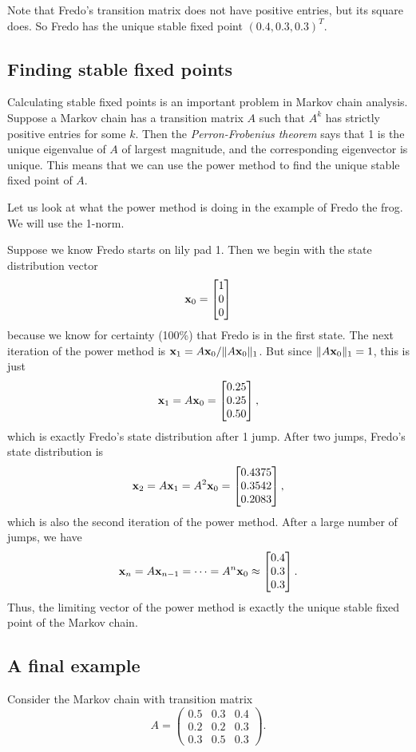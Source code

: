 Note that Fredo's transition matrix does not have positive entries, but its square does. 
So Fredo has the unique stable fixed point $(0.4, 0.3, 0.3)^T$.

\subsection*{Finding stable fixed points}
Calculating stable fixed points is an important problem in Markov chain analysis. 
Suppose a Markov chain has a transition matrix $A$ such that $A^k$ has strictly positive entries for some $k$. 
Then the \emph{Perron-Frobenius theorem} says that 1 is the unique eigenvalue of $A$ of largest magnitude, and the corresponding eigenvector is unique. 
This means that we can use the power method to find the unique stable fixed point of $A$.

Let us look at what the power method is doing in the example of Fredo the frog. 
We will use the 1-norm. 

Suppose we know Fredo starts on lily pad 1. Then we begin with the state distribution vector
\[
{\bf x}_0 = \begin{bmatrix}
1\\
0\\
0
\end{bmatrix}
\]
because we know for certainty (100\%) that Fredo is in the first state.
The next iteration of the power method is ${\bf x}_1=A{\bf x}_0/\|A{\bf x}_0\|_1$. But since $\|A{\bf x}_0\|_1=1$, this is just
\[
{\bf x}_1 = A {\bf x}_0 = \begin{bmatrix}
0.25\\
0.25\\
0.50
\end{bmatrix},
\]
which is exactly Fredo's state distribution after 1 jump.
After two jumps, Fredo's state distribution is
\[
{\bf x}_2 = A {\bf x}_1 = A^2 {\bf x}_0 = \begin{bmatrix}
0.4375\\
0.3542\\
0.2083
\end{bmatrix},
\]
which is also the second iteration of the power method.
After a large number of jumps, we have
\[
{\bf x}_n = A {\bf x}_{n-1} = \dots = A^n {\bf x}_0 \approx \begin{bmatrix}
0.4\\
0.3\\
0.3
\end{bmatrix}.
\]
Thus, the limiting vector of the power method is exactly the unique stable fixed point of the Markov chain. 

\subsection*{A final example}
Consider the Markov chain with transition matrix
\[
A = \begin{pmatrix}
0.5 & 0.3 & 0.4\\
0.2 & 0.2 & 0.3\\
0.3 & 0.5 & 0.3
\end{pmatrix}.
\]

